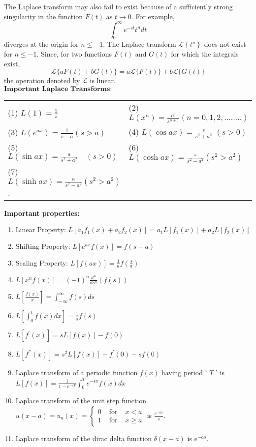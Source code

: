 The Laplace transform may also fail to exist because of a sufficiently strong singularity in the function $F(t)$ as $t \rightarrow 0$. For example,
\begin{equation*}
\int_{0}^{\infty} e^{-s t} t^{n} d t
\end{equation*}
diverges at the origin for $n \leq-1$. The Laplace transform $\mathcal{L}\left\{t^{n}\right\}$ does not exist for $n \leq-1$. Since, for two functions $F(t)$ and $G(t)$ for which the integrals exist,
\begin{equation}
\mathcal{L}\{a F(t)+b G(t)\}=a \mathcal{L}\{F(t)\}+b \mathcal{L}\{G(t)\}
\end{equation}
the operation denoted by $\mathcal{L}$ is linear.\\
$\textbf{Important Laplace Transforms:}$\\
\renewcommand*{\arraystretch}{2}
\begin{tabular}{p{6cm}p{6cm}}
	(1) $L(1)=\frac{1}{s}$&
(2) $L\left(x^{n}\right)=\frac{n !}{s^{n+1}}(n=0,1,2, \ldots \ldots . .)$\\
(3) $L\left(e^{a x}\right)=\frac{1}{s-a}(s>a)$&
(4) $L(\cos a x)=\frac{s}{s^{2}+a^{2}}$
$(s>0)$\\
(5) $L(\sin a x)=\frac{a}{s^{2}+a^{2}} \quad(s>0)$&
(6) $L(\cosh a x)=\frac{s}{s^{2}-a^{2}}\left(s^{2}>a^{2}\right)$\\
(7) $L(\sinh a x)=\frac{a}{s^{2}-a^{2}}\left(s^{2}>a^{2}\right)$.& 
\end{tabular}
\textbf{Important properties:}\\
\begin{enumerate}
	\item Linear Property: $L\left[a_{1} f_{1}(x)+a_{2} f_{2}(x)\right]=a_{1} L\left[f_{1}(x)\right]+a_{2} L\left[f_{2}(x)\right]$
	\item Shifting Property: $L\left[e^{a x} f(x)\right]=f(s-a)$
	\item Scaling Property: $L[f(a x)]=\frac{1}{a} f\left(\frac{s}{a}\right)$
	\item $L\left[x^{n} f(x)\right]=(-1)^{n} \frac{d^{n}}{d s^{n}}(f(s))$
	\item $L\left[\frac{f(x)}{x}\right]=\int_{-\infty}^{\infty} f(s) d s$
	\item $L\left[\int_{0}^{t} f(x) d x\right]=\frac{1}{s} f(s)$
	\item $L\left[f^{\prime}(x)\right]=s L[f(x)]-f(0)$
	\item  $L\left[f^{\prime \prime}(x)\right]=s^{2} L[f(x)]-f^{\prime}(0)-s f(0)$
	\item Laplace transform of a periodic function $f(x)$ having period ' $T$ ' is\\$L[f(\dot{x})]=\frac{1}{1-e^{-s T}} \int_{0}^{T} e^{-s x} f(\dot{x}) d \dot{x}$
	\item Laplace transform of the unit step function $u(x-a)=u_{a}(x)=\left\{\begin{array}{lll}0 & \text { for } & x<a \\ 1 & \text { for } & x \geq a\end{array}\right.$ is $\frac{e^{-a s}}{s}$.
	\item Laplace transform of the dirac delta function $\delta(x-a)$ is $e^{-a s}$.
\end{enumerate}
